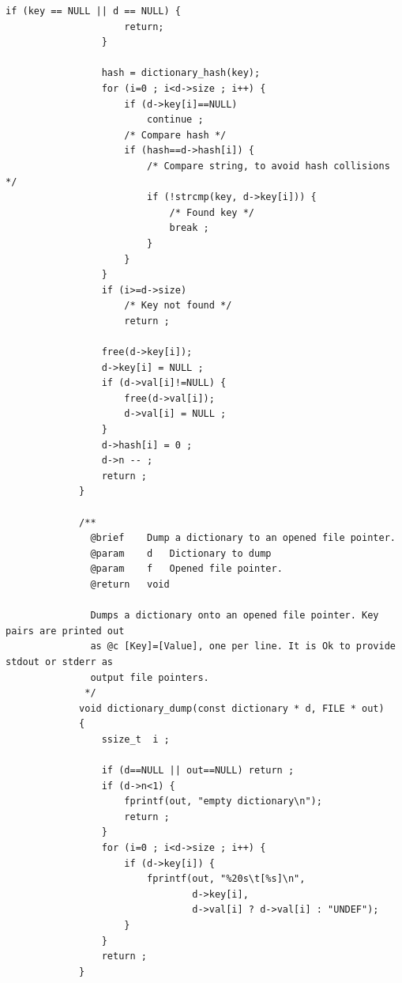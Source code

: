\documentclass{article}
\begin{document}
\begin{Verbatim}[gobble=8]
                 if (key == NULL || d == NULL) {
                     return;
                 }
             
                 hash = dictionary_hash(key);
                 for (i=0 ; i<d->size ; i++) {
                     if (d->key[i]==NULL)
                         continue ;
                     /* Compare hash */
                     if (hash==d->hash[i]) {
                         /* Compare string, to avoid hash collisions */
                         if (!strcmp(key, d->key[i])) {
                             /* Found key */
                             break ;
                         }
                     }
                 }
                 if (i>=d->size)
                     /* Key not found */
                     return ;
             
                 free(d->key[i]);
                 d->key[i] = NULL ;
                 if (d->val[i]!=NULL) {
                     free(d->val[i]);
                     d->val[i] = NULL ;
                 }
                 d->hash[i] = 0 ;
                 d->n -- ;
                 return ;
             }
             
             /**
               @brief    Dump a dictionary to an opened file pointer.
               @param    d   Dictionary to dump
               @param    f   Opened file pointer.
               @return   void
             
               Dumps a dictionary onto an opened file pointer. Key pairs are printed out
               as @c [Key]=[Value], one per line. It is Ok to provide stdout or stderr as
               output file pointers.
              */
             void dictionary_dump(const dictionary * d, FILE * out)
             {
                 ssize_t  i ;
             
                 if (d==NULL || out==NULL) return ;
                 if (d->n<1) {
                     fprintf(out, "empty dictionary\n");
                     return ;
                 }
                 for (i=0 ; i<d->size ; i++) {
                     if (d->key[i]) {
                         fprintf(out, "%20s\t[%s]\n",
                                 d->key[i],
                                 d->val[i] ? d->val[i] : "UNDEF");
                     }
                 }
                 return ;
             }             
            \end{Verbatim}
\end{document}
